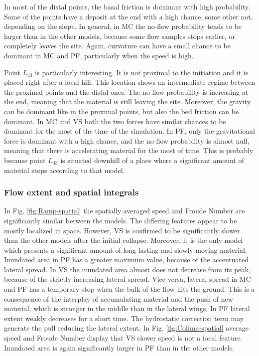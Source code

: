 \documentclass{article}
\begin{document}
In most of the distal points, the basal friction is dominant with high probability. Some of the points have a deposit at the end with a high chance, some other not, depending on the slope. In general, in MC the no-flow probability tends to be larger than in the other models, because some flow samples stops earlier, or completely leaves the site. Again, curvature can have a small chance to be dominant in MC and PF, particularly when the speed is high.

Point $L_{43}$ is particularly interesting. It is not proximal to the initiation and it is placed right after a local hill. This location shows an intermediate regime between the proximal points and the distal ones. The no-flow probability is increasing at the end, meaning that the material is still leaving the site. Moreover, the gravity can be dominant like in the proximal points, but also the bed friction can be dominant. In MC and VS both the two forces have similar chances to be dominant for the most of the time of the simulation. In PF, only the gravitational force is dominant with a high chance, and the no-flow probability is almost null, meaning that there is accelerating material for the most of time. This is probably because point $L_{43}$ is situated downhill of a place where a significant amount of material stops according to that model.

\subsubsection{Flow extent and spatial integrals}
In Fig. \ref{fig:Ramp-spatial} the spatially averaged speed and Froude Number are significantly similar between the models. The differing features appear to be mostly localized in space. However, VS is confirmed to be significantly slower than the other models after the initial collapse. Moreover, it is the only model which presents a significant amount of long lasting and slowly moving material. Inundated area in PF has a greater maximum value, because of the accentuated lateral spread. In VS the inundated area almost does not decrease from its peak, because of the strictly increasing lateral spread. Vice versa, lateral spread in MC and PF has a temporary stop when the bulk of the flow hits the ground. This is a consequence of the interplay of accumulating material and the push of new material, which is stronger in the middle than in the lateral wings. In PF lateral extent weakly decreases for a short time. The hydrostatic correction term may generate the pull reducing the lateral extent. In Fig. \ref{fig:Colima-spatial} average speed and Froude Number display that VS slower speed is not a local feature. Inundated area is again significantly larger in PF than in the other models.
\end{document}
